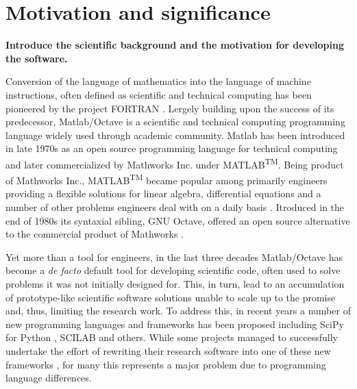 \section{Motivation and significance}

\textbf{Introduce the scientific background and the motivation for developing the software.}

Conversion of the language of mathematics into the language of machine instructions, often defined as scientific and technical computing has been pioneered by the project FORTRAN \cite{Backus:1957:FAC}. Lergely building upon the success of its predecessor, Matlab/Octave is a scientific and technical computing programming language widely used through academic community. Matlab has been introduced in late 1970s as an open source programming language for technical computing and later commercialized by Mathworks Inc. under MATLAB\textsuperscript{TM}. Being product of Mathworks Inc., MATLAB\textsuperscript{TM} became popular among primarily engineers providing a flexible solutions for linear algebra, differential equations and a number of other problems engineers deal with on a daily basis \cite{moore2014matlab}. Itroduced in the end of 1980s its syntaxial sibling, GNU Octave, offered an open source alternative to the commercial product of Mathworks \cite{eaton1997gnu}.

Yet more than a tool for engineers, in the last three decades Matlab/Octave has become a \textit{de facto} default tool for developing scientific code, often used to solve problems it was not initially designed for. This, in turn, lead to an accumulation of prototype-like scientific software solutions unable to scale up to the promise and, thus, limiting the research work. To address this, in recent years a number of new programming languages and frameworks has been proposed including SciPy for Python \cite{jones2001open, Olivier_2002}, SCILAB \cite{Campbell_2009} and others. While some projects managed to successfully undertake the effort of rewriting their research software into one of these new frameworks \cite{17076895, 21349861}, for many this represents a major problem due to programming language differences.

